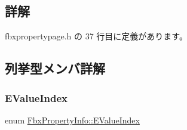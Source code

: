 \subsection{詳解}


 fbxpropertypage.\+h の 37 行目に定義があります。



\subsection{列挙型メンバ詳解}
\mbox{\label{class_fbx_property_info_a83069f079a29bde133f2e9324de5af43}} 
\subsubsection{\texorpdfstring{E\+Value\+Index}{EValueIndex}}
{\footnotesize\ttfamily enum \hyperlink{class_fbx_property_info_a83069f079a29bde133f2e9324de5af43}{Fbx\+Property\+Info\+::\+E\+Value\+Index}}

